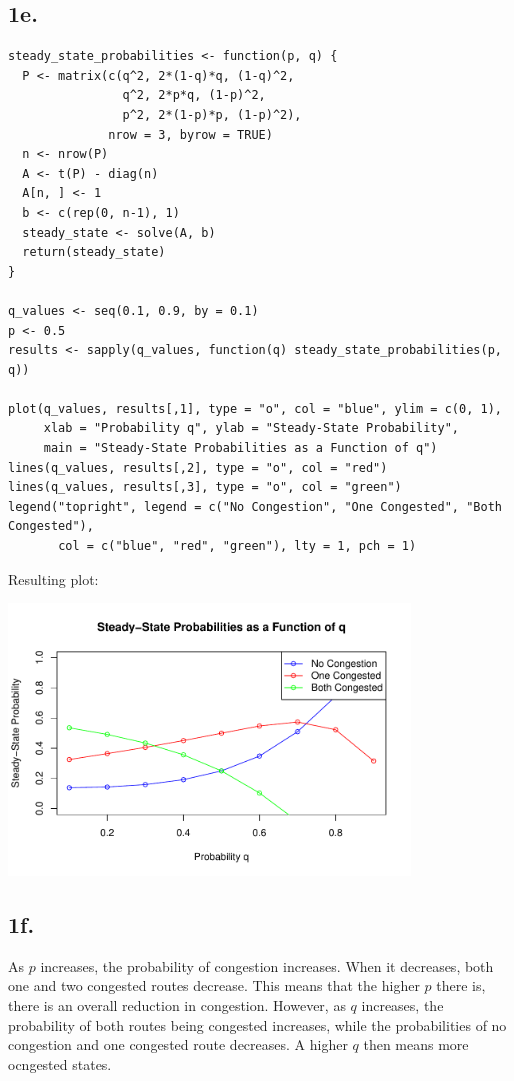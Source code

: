 \documentclass[12pt]{article}
\begin{document}
\subsection*{1e.}

\begin{verbatim}
steady_state_probabilities <- function(p, q) {
  P <- matrix(c(q^2, 2*(1-q)*q, (1-q)^2,
                q^2, 2*p*q, (1-p)^2,
                p^2, 2*(1-p)*p, (1-p)^2),
              nrow = 3, byrow = TRUE)
  n <- nrow(P)
  A <- t(P) - diag(n)  
  A[n, ] <- 1          
  b <- c(rep(0, n-1), 1)  
  steady_state <- solve(A, b)
  return(steady_state)
}

q_values <- seq(0.1, 0.9, by = 0.1)
p <- 0.5
results <- sapply(q_values, function(q) steady_state_probabilities(p, q))

plot(q_values, results[,1], type = "o", col = "blue", ylim = c(0, 1),
     xlab = "Probability q", ylab = "Steady-State Probability",
     main = "Steady-State Probabilities as a Function of q")
lines(q_values, results[,2], type = "o", col = "red")
lines(q_values, results[,3], type = "o", col = "green")
legend("topright", legend = c("No Congestion", "One Congested", "Both Congested"),
       col = c("blue", "red", "green"), lty = 1, pch = 1)
\end{verbatim}

Resulting plot:

\begin{center}
    \includegraphics[width=0.8\textwidth]{project2_1e.pdf} %
\end{center}

\subsection*{1f.}

As $p$ increases, the probability of congestion increases. When it decreases, both one and two congested routes decrease. This means that the higher $p$ there is, there is an overall reduction in congestion. However, as $q$ increases, the probability of both routes being congested increases, while the probabilities of no congestion and one congested route decreases. A higher $q$ then means more ocngested states. 
\end{document}
